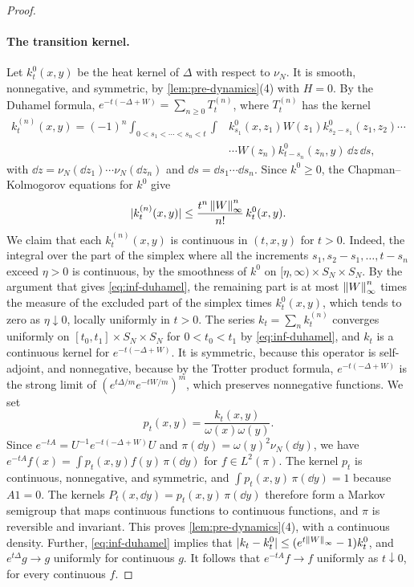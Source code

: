 \begin{proof}
\paragraph{The transition kernel.} Let $k^0_t(x,y)$ be the heat kernel of $\Delta$ with respect to $\nu_N$. It is smooth, nonnegative, and symmetric, by \cref{lem:pre-dynamics}(4) with $H=0$. By the Duhamel formula, $e^{-t(-\Delta+W)}=\sum_{n\ge0}T^{(n)}_t$, where $T^{(n)}_t$ has the kernel
\begin{equation*}
\begin{split}
k^{(n)}_t(x,y)=(-1)^n\int_{0<s_1<\cdots<s_n<t}\int&k^0_{s_1}(x,z_1)W(z_1)k^0_{s_2-s_1}(z_1,z_2)\cdots\\
&\cdots W(z_n)k^0_{t-s_n}(z_n,y)\,\dd z\,\dd s,
\end{split}
\end{equation*}
with $\dd z=\nu_N(\dd z_1)\cdots\nu_N(\dd z_n)$ and $\dd s=\dd s_1\cdots\dd s_n$. Since $k^0\ge0$, the Chapman--Kolmogorov equations for $k^0$ give
\begin{equation}\label{eq:inf-duhamel}
|k^{(n)}_t(x,y)|\le\frac{t^n\left\lVert W\right\rVert_\infty^n}{n!}\,k^0_t(x,y).
\end{equation}
We claim that each $k^{(n)}_t(x,y)$ is continuous in $(t,x,y)$ for $t>0$. Indeed, the integral over the part of the simplex where all the increments $s_1,s_2-s_1,\dots,t-s_n$ exceed $\eta>0$ is continuous, by the smoothness of $k^0$ on $[\eta,\infty)\times S_N\times S_N$. By the argument that gives \eqref{eq:inf-duhamel}, the remaining part is at most $\left\lVert W\right\rVert_\infty^n$ times the measure of the excluded part of the simplex times $k^0_t(x,y)$, which tends to zero as $\eta\downarrow0$, locally uniformly in $t>0$. The series $k_t=\sum_nk^{(n)}_t$ converges uniformly on $[t_0,t_1]\times S_N\times S_N$ for $0<t_0<t_1$ by \eqref{eq:inf-duhamel}, and $k_t$ is a continuous kernel for $e^{-t(-\Delta+W)}$. It is symmetric, because this operator is self-adjoint, and nonnegative, because by the Trotter product formula, $e^{-t(-\Delta+W)}$ is the strong limit of $(e^{t\Delta/m}e^{-tW/m})^m$, which preserves nonnegative functions. We set
\begin{equation*}
p_t(x,y)=\frac{k_t(x,y)}{\omega(x)\omega(y)}.
\end{equation*}
Since $e^{-tA}=U^{-1}e^{-t(-\Delta+W)}U$ and $\pi(\dd y)=\omega(y)^2\nu_N(\dd y)$, we have $e^{-tA}f(x)=\int p_t(x,y)f(y)\,\pi(\dd y)$ for $f\in L^2(\pi)$. The kernel $p_t$ is continuous, nonnegative, and symmetric, and $\int p_t(x,y)\,\pi(\dd y)=1$ because $A1=0$. The kernels $P_t(x,\dd y)=p_t(x,y)\,\pi(\dd y)$ therefore form a Markov semigroup that maps continuous functions to continuous functions, and $\pi$ is reversible and invariant. This proves \cref{lem:pre-dynamics}(4), with a continuous density. Further, \eqref{eq:inf-duhamel} implies that $|k_t-k^0_t|\le(e^{t\left\lVert W\right\rVert_\infty}-1)k^0_t$, and $e^{t\Delta}g\to g$ uniformly for continuous $g$. It follows that $e^{-tA}f\to f$ uniformly as $t\downarrow0$, for every continuous $f$.


\end{proof}
